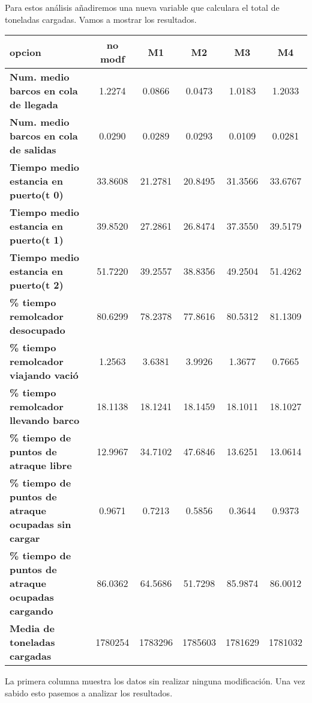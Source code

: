 \documentclass[]{article}
\begin{document}
Para estos análisis añadiremos una nueva variable que calculara el total de toneladas cargadas. Vamos a mostrar los resultados.

\begin{table}[H]
	\begin{center}
		\begin{tabularx}{1\textwidth}{|X|c|c|c|c|c|}
			\hline
			\textbf{opcion}&\textbf{no modf} &  \textbf{M1} & \textbf{M2} &\textbf{M3} & \textbf{M4}\\
			\hline \hline
			\textbf{Num. medio barcos en cola de llegada}& 1.2274 & 0.0866 &0.0473 &1.0183 &1.2033 \\ \hline
			\textbf{Num. medio barcos en cola de salidas}& 0.0290& 0.0289& 0.0293 &0.0109 &0.0281 \\ \hline
			\textbf{Tiempo medio estancia en puerto(t 0)}& 33.8608& 21.2781&20.8495 &31.3566 &33.6767 \\ \hline
			\textbf{Tiempo medio estancia en puerto(t 1)}& 39.8520& 27.2861&26.8474 &37.3550 &39.5179 \\ \hline
			\textbf{Tiempo medio estancia en puerto(t 2)}& 51.7220& 39.2557&38.8356 &49.2504 &51.4262 \\ \hline
			\textbf{\% tiempo remolcador desocupado}& 80.6299&78.2378 &77.8616 &80.5312 &81.1309 \\ \hline
			\textbf{\% tiempo remolcador viajando vació}& 1.2563& 3.6381&3.9926 &1.3677 &0.7665 \\ \hline
			\textbf{\% tiempo remolcador llevando barco}& 18.1138& 18.1241&18.1459 &18.1011 &18.1027 \\ \hline
			\textbf{\% tiempo de puntos de atraque libre}& 12.9967& 34.7102&47.6846 &13.6251 &13.0614 \\ \hline
			\textbf{\% tiempo de puntos de atraque ocupadas sin cargar}& 0.9671 &0.7213 &0.5856 &0.3644 & 0.9373\\ \hline
			\textbf{\% tiempo de puntos de atraque ocupadas cargando}& 86.0362 &64.5686 &51.7298 & 85.9874 &86.0012 \\ \hline
			\textbf{Media de toneladas cargadas}& 1780254 & 1783296 & 1785603& 1781629 & 1781032  \\ \hline
		\end{tabularx}
		
	\end{center}
\end{table}

La primera columna muestra los datos sin realizar ninguna modificación. Una vez sabido esto pasemos a analizar los resultados.
\newpage
\end{document}
